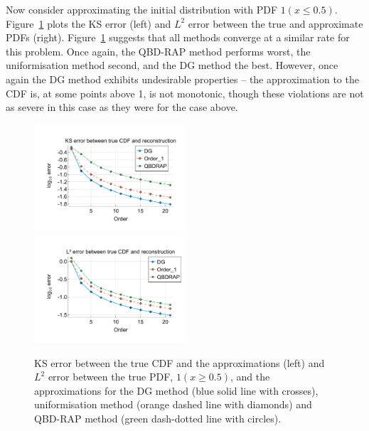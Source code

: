 Now consider approximating the initial distribution with PDF \(1(x\leq 0.5)\). Figure~\ref{fig: fun 2 comp} plots the KS error (left) and \(L^2\) error between the true and approximate PDFs (right). Figure~\ref{fig: fun 2 comp} suggests that all methods converge at a similar rate for this problem. Once again, the QBD-RAP method performs worst, the uniformisation method second, and the DG method the best. However, once again the DG method exhibits undesirable properties -- the approximation to the CDF is, at some points above 1, is not monotonic, though these violations are not as severe in this case as they were for the case above. 
\begin{figure}
	\centering
	\includegraphics[width=0.5\textwidth,trim={1.25cm 0.8cm 0.25cm 1.25cm},clip]{chapter5/figs/comp/fun2/meshs_ks_error_formatted.pdf}%
	\includegraphics[width=0.5\textwidth,trim={1.25cm 0.8cm 0.25cm 1.25cm},clip]{chapter5/figs/comp/fun2/meshs_l2_pdf_error_formatted.pdf}
	\caption{KS error between the true CDF and the approximations (left) and \(L^2\) error between the true PDF, \(1(x\geq 0.5)\), and the approximations for the DG method (blue solid line with crosses), uniformisation method (orange dashed line with diamonds) and QBD-RAP method (green dash-dotted line with circles).}
	\label{fig: fun 2 comp} 
\end{figure}

